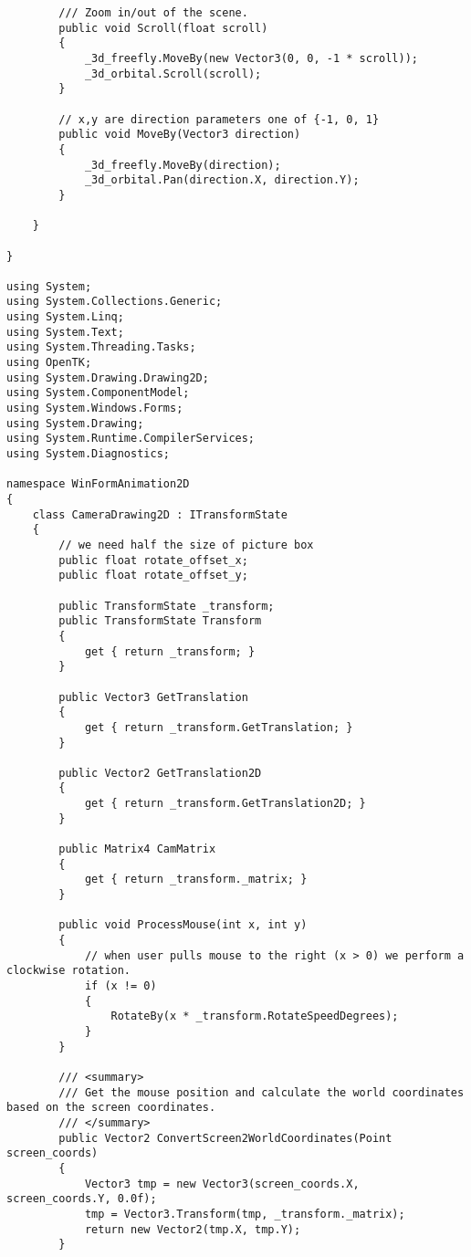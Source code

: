 \begin{scriptsize}
\begin{verbatim}
        /// Zoom in/out of the scene.
        public void Scroll(float scroll)
        {
            _3d_freefly.MoveBy(new Vector3(0, 0, -1 * scroll));
            _3d_orbital.Scroll(scroll);
        }

        // x,y are direction parameters one of {-1, 0, 1}
        public void MoveBy(Vector3 direction)
        {
            _3d_freefly.MoveBy(direction);
            _3d_orbital.Pan(direction.X, direction.Y);
        }

    }

}

using System;
using System.Collections.Generic;
using System.Linq;
using System.Text;
using System.Threading.Tasks;
using OpenTK;
using System.Drawing.Drawing2D;
using System.ComponentModel;
using System.Windows.Forms;
using System.Drawing;
using System.Runtime.CompilerServices;
using System.Diagnostics;

namespace WinFormAnimation2D
{
    class CameraDrawing2D : ITransformState
    {
        // we need half the size of picture box
        public float rotate_offset_x;
        public float rotate_offset_y;

        public TransformState _transform;
        public TransformState Transform
        {
            get { return _transform; }
        }

        public Vector3 GetTranslation
        {
            get { return _transform.GetTranslation; }
        }

        public Vector2 GetTranslation2D
        {
            get { return _transform.GetTranslation2D; }
        }

        public Matrix4 CamMatrix
        {
            get { return _transform._matrix; }
        }

        public void ProcessMouse(int x, int y)
        {
            // when user pulls mouse to the right (x > 0) we perform a clockwise rotation.
            if (x != 0)
            {
                RotateBy(x * _transform.RotateSpeedDegrees);
            }
        }

        /// <summary>
        /// Get the mouse position and calculate the world coordinates based on the screen coordinates.
        /// </summary>
        public Vector2 ConvertScreen2WorldCoordinates(Point screen_coords)
        {
            Vector3 tmp = new Vector3(screen_coords.X, screen_coords.Y, 0.0f);
            tmp = Vector3.Transform(tmp, _transform._matrix);
            return new Vector2(tmp.X, tmp.Y);
        }


\end{verbatim}
\end{scriptsize}
